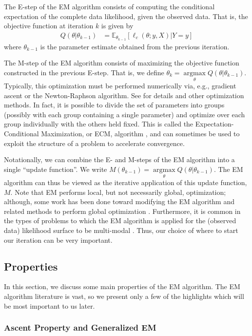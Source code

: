 \documentclass[ss]{imsart}
\theoremstyle{plain}
\theoremstyle{definition}
\theoremstyle{remark}
\newcommand{\bE}{\mathbb{E}}
\DeclareMathOperator*{\argmax}{argmax}
\begin{document}
The E-step of the EM algorithm consists of computing the conditional expectation of the complete data likelihood, given the observed data. That is, the objective function at iteration $k$ is given by
%
\begin{align}
    Q(\theta|\theta_{k-1}) & = \bE_{\theta_{k-1}}[\ell_c(\theta; y, X) | Y=y]
\end{align}
%
where $\theta_{k-1}$ is the parameter estimate obtained from the previous iteration. 

The M-step of the EM algorithm consists of maximizing the objective function constructed in the previous E-step. That is, we define $\theta_k = \argmax\limits_\theta Q(\theta|\theta_{k-1})$. Typically, this optimization must be performed numerically via, e.g., gradient ascent or the Newton-Raphson algorithm. See \citet{Noc06} for details and other optimization methods. In fact, it is possible to divide the set of parameters into groups (possibly with each group containing a single parameter) and optimize over each group individually with the others held fixed. This is called the Expectation-Conditional Maximization, or ECM, algorithm \citep{Men93}, and can sometimes be used to exploit the structure of a problem to accelerate convergence.

Notationally, we can combine the E- and M-steps of the EM algorithm into a single ``update function''. We write $M(\theta_{k-1}) = \argmax\limits_\theta Q(\theta|\theta_{k-1})$. The EM algorithm can thus be viewed as the iterative application of this update function, $M$. Note that EM performs local, but not necessarily global, optimization; although, some work has been done toward modifying the EM algorithm and related methods to perform global optimization \citep{Jan06II, Jan06III}. Furthermore, it is common in the types of problems to which the EM algorithm is applied for the (observed data) likelihood surface to be multi-modal \citep{McL08}. Thus, our choice of where to start our iteration can be very important.

\subsection{Properties}

In this section, we discuss some main properties of the EM algorithm. The EM algorithm literature is vast, so we present only a few of the highlights which will be most important to us later.

\subsubsection{Ascent Property and Generalized EM}
\label{sec:GEM}
\end{document}
